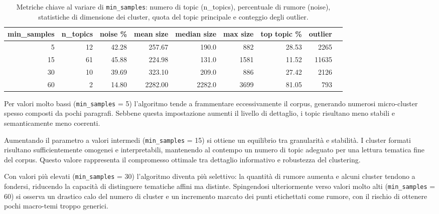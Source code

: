 \begin{table}[H]
\centering
\footnotesize
\begin{tabular}{rrrrrrrrr}
\hline
min\_samples & n\_topics & noise \% & mean size & median size & max size & top topic \% & outlier \\
\hline
5  & 12 & 42.28 & 257.67 & 190.0 & 882  & 28.53  & 2265 \\
15 & 61 & 45.88 & 224.98 & 131.0 & 1581 & 11.52 & 11635 \\
30 & 10 & 39.69 & 323.10 & 209.0 & 886  & 27.42  & 2126 \\
60 & 2  & 14.80 & 2282.00 & 2282.0 & 3699 & 81.05  & 793  \\
\hline
\end{tabular}
\caption{Metriche chiave al variare di \texttt{min\_samples}: numero di topic (n\_topics), percentuale di rumore (noise), statistiche di dimensione dei cluster, quota del topic principale e conteggio degli outlier.}
\label{tab:min-samples-summary}
\end{table}
Per valori molto bassi (\texttt{min\_samples} = 5) l'algoritmo tende a frammentare eccessivamente il corpus, generando numerosi micro-cluster spesso composti da pochi paragrafi. 
Sebbene questa impostazione aumenti il livello di dettaglio, i topic risultano meno stabili e semanticamente meno coerenti.

Aumentando il parametro a valori intermedi (\texttt{min\_samples} = 15) si ottiene un equilibrio tra granularità e stabilità. 
I cluster formati risultano sufficientemente omogenei e interpretabili, mantenendo al contempo un numero di topic adeguato per una lettura tematica fine del corpus. 
Questo valore rappresenta il compromesso ottimale tra dettaglio informativo e robustezza del clustering.

Con valori più elevati (\texttt{min\_samples} = 30) l’algoritmo diventa più selettivo: la quantità di rumore aumenta e alcuni cluster tendono a fondersi, riducendo la capacità di distinguere tematiche affini ma distinte. 
Spingendosi ulteriormente verso valori molto alti (\texttt{min\_samples} = 60) si osserva un drastico calo del numero di cluster e un incremento marcato dei punti etichettati come rumore, con il rischio di ottenere pochi macro-temi troppo generici.

